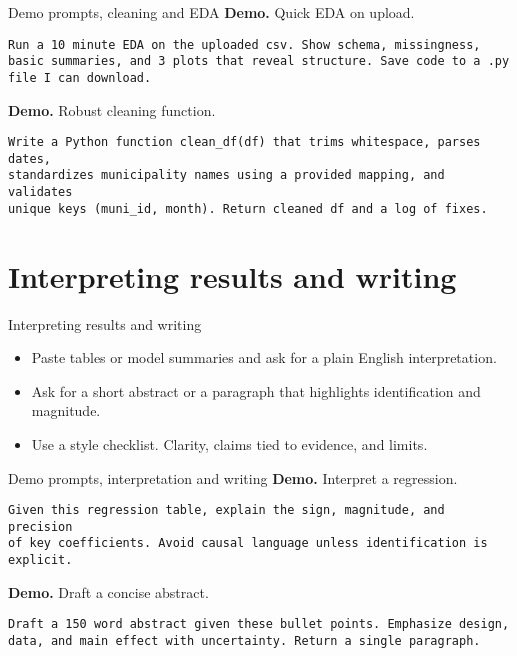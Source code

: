 \documentclass[aspectratio=169,professionalfonts]{beamer}
\newcommand{\demo}{\textbf{Demo. }}
\begin{document}
\begin{frame}[fragile]{Demo prompts, cleaning and EDA}
\demo Quick EDA on upload.
\begin{verbatim}
Run a 10 minute EDA on the uploaded csv. Show schema, missingness,
basic summaries, and 3 plots that reveal structure. Save code to a .py
file I can download.
\end{verbatim}

\demo Robust cleaning function.
\begin{verbatim}
Write a Python function clean_df(df) that trims whitespace, parses dates,
standardizes municipality names using a provided mapping, and validates
unique keys (muni_id, month). Return cleaned df and a log of fixes.
\end{verbatim}
\end{frame}

\section{Interpreting results and writing}

\begin{frame}{Interpreting results and writing}
  \begin{itemize}
    \item Paste tables or model summaries and ask for a plain English interpretation.
    \item Ask for a short abstract or a paragraph that highlights identification and magnitude.
    \item Use a style checklist. Clarity, claims tied to evidence, and limits.
  \end{itemize}
\end{frame}

\begin{frame}[fragile]{Demo prompts, interpretation and writing}
\demo Interpret a regression.
\begin{verbatim}
Given this regression table, explain the sign, magnitude, and precision
of key coefficients. Avoid causal language unless identification is explicit.
\end{verbatim}

\demo Draft a concise abstract.
\begin{verbatim}
Draft a 150 word abstract given these bullet points. Emphasize design,
data, and main effect with uncertainty. Return a single paragraph.
\end{verbatim}
\end{frame}
\end{document}
